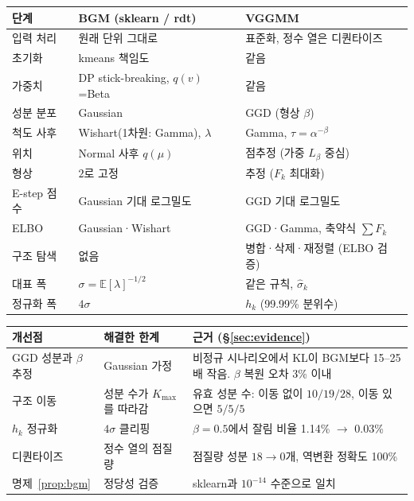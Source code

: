 \documentclass[11pt]{article}
\newcommand{\E}{\mathbb{E}}
\begin{document}
\begin{center}
\small
\begin{tabular}{p{2.6cm}p{5.4cm}p{5.6cm}}
\toprule
단계 & BGM (sklearn / rdt) & VGGMM \\
\midrule
입력 처리 & 원래 단위 그대로 & 표준화, 정수 열은 디퀀타이즈 \\
초기화 & kmeans 책임도 & 같음 \\
가중치 & DP stick-breaking, $q(v)$=Beta & 같음 \\
성분 분포 & Gaussian & GGD (형상 $\beta$) \\
척도 사후 & Wishart(1차원: Gamma), $\lambda$ & Gamma, $\tau=\alpha^{-\beta}$ \\
위치 & Normal 사후 $q(\mu)$ & 점추정 (가중 $L_\beta$ 중심) \\
형상 & $2$로 고정 & 추정 ($F_k$ 최대화) \\
E-step 점수 & Gaussian 기대 로그밀도 & GGD 기대 로그밀도 \\
ELBO & Gaussian·Wishart & GGD·Gamma, 축약식 $\sum F_k$ \\
구조 탐색 & 없음 & 병합·삭제·재정렬 (ELBO 검증) \\
대표 폭 & $\sigma=\E[\lambda]^{-1/2}$ & 같은 규칙, $\hat\sigma_k$ \\
정규화 폭 & $4\sigma$ & $h_k$ (99.99\% 분위수) \\
\bottomrule
\end{tabular}
\end{center}

\begin{center}
\small
\begin{tabular}{p{3.6cm}p{4.6cm}p{5.4cm}}
\toprule
개선점 & 해결한 한계 & 근거 (\S\ref{sec:evidence}) \\
\midrule
GGD 성분과 $\beta$ 추정 & Gaussian 가정 & 비정규 시나리오에서 KL이 BGM보다 15--25배 작음. $\beta$ 복원 오차 3\% 이내 \\
구조 이동 & 성분 수가 $K_{\max}$를 따라감 & 유효 성분 수: 이동 없이 $10/19/28$, 이동 있으면 $5/5/5$ \\
$h_k$ 정규화 & $4\sigma$ 클리핑 & $\beta=0.5$에서 잘림 비율 1.14\% $\to$ 0.03\% \\
디퀀타이즈 & 정수 열의 점질량 & 점질량 성분 $18\to0$개, 역변환 정확도 100\% \\
명제~\ref{prop:bgm} & 정당성 검증 & sklearn과 $10^{-14}$ 수준으로 일치 \\
\bottomrule
\end{tabular}
\end{center}
\end{document}
